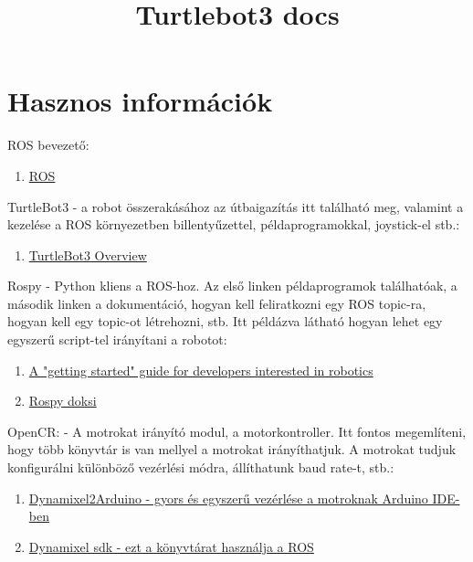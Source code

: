 \documentclass{article}
\title{Turtlebot3 docs}
\author{}
\date{}
\begin{document}
\maketitle

\section{Hasznos információk}
    ROS bevezető:
    \begin{enumerate}
        \item \href{http://wiki.ros.org/ROS/Tutorials}{ROS}
    \end{enumerate}
    
    TurtleBot3 - a robot összerakásához az útbaigazítás itt található meg, valamint a kezelése a ROS környezetben billentyűzettel, példaprogramokkal, joystick-el stb.:
    \begin{enumerate}
        \item \href{https://emanual.robotis.com/docs/en/platform/turtlebot3/overview/}{TurtleBot3 Overview}
    \end{enumerate}
    
    Rospy - Python kliens a ROS-hoz. Az első linken példaprogramok találhatóak, a második linken a dokumentáció, hogyan kell feliratkozni egy ROS topic-ra, hogyan kell egy topic-ot létrehozni, stb. Itt példázva látható hogyan lehet egy egyszerű script-tel irányítani a robotot:
    \begin{enumerate}
        \item \href{https://github.com/markwsilliman/turtlebot/} {A "getting started" guide for developers interested in robotics}
        \item \href{http://wiki.ros.org/rospy/Overview}{Rospy doksi}
    \end{enumerate}
    
    OpenCR: - A motrokat irányító modul, a motorkontroller. Itt fontos megemlíteni, hogy több könyvtár is van mellyel a motrokat irányíthatjuk. A motrokat tudjuk konfigurálni különböző vezérlési módra, állíthatunk baud rate-t, stb.:
    \begin{enumerate}
        \item \href{https://www.youtube.com/watch?v=0_M0Da9SHDw}{Dynamixel2Arduino - gyors és egyszerű vezérlése a motroknak Arduino IDE-ben}
        \item \href{https://emanual.robotis.com/docs/en/software/dynamixel/dynamixel_sdk/overview/}{Dynamixel sdk - ezt a könyvtárat használja a ROS}
    \end{enumerate}
    
\end{document}
